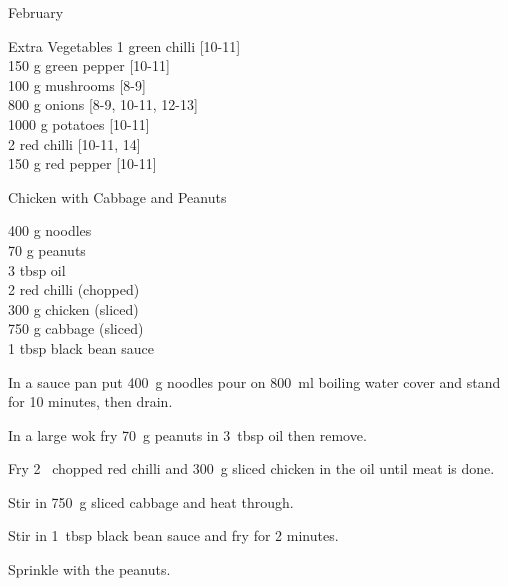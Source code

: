 \begin{menu}{February}
\begin{shoppinglist}{Extra Vegetables}
      1  green chilli 
        {\scriptsize[10-11]}\\
      150 g green pepper 
        {\scriptsize[10-11]}\\
      100 g mushrooms 
        {\scriptsize[8-9]}\\
      800 g onions 
        {\scriptsize[8-9, 10-11, 12-13]}\\
      1000 g potatoes 
        {\scriptsize[10-11]}\\
      2  red chilli 
        {\scriptsize[10-11, 14]}\\
      150 g red pepper 
        {\scriptsize[10-11]}\\
      \end{shoppinglist}%
      \par\vfil %
    \vfil\clearpage
  
    \begin{recipe}{2}{Chicken with Cabbage and Peanuts}%
    
		\begin{ingredients}
		400 g noodles  \\
	70 g peanuts  \\
	3 tbsp oil  \\
	2  red chilli (chopped) \\
	300 g chicken (sliced) \\
	750 g cabbage (sliced) \\
	1 tbsp black bean sauce  \\
	
		\end{ingredients}
	
    \begin{instructions}
    \item 
      In a sauce pan
      put
      400~g  noodles
      pour on
      800~ml  boiling water
      cover and stand for 10 minutes, then drain.
    \item 
        In a large wok	fry
        70~g  peanuts
        in
        3~tbsp  oil
        then remove.
      \item 
        Fry 2~ chopped red chilli
        and
        300~g sliced chicken
        in the oil until meat is done.
      \item 
        Stir in
        750~g sliced cabbage
        and heat through.
      \item 
        Stir in
        1~tbsp  black bean sauce
        and fry for 2 minutes.
      \item 
        Sprinkle with the peanuts.
      

\end{instructions}
\end{recipe}
\end{menu}
